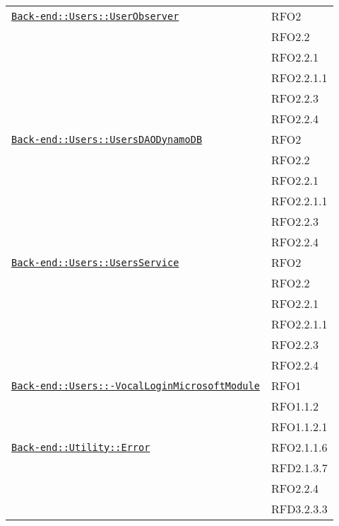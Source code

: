 \begin{longtable}{|>{\centering}m{10cm}|m{3cm}<{\centering}|}
\hyperref[Back-end::Users::UserObserver]{\texttt{Back-end::Users::UserObserver}} & RFO2\\
& RFO2.2\\
& RFO2.2.1\\
& RFO2.2.1.1\\
& RFO2.2.3\\
& RFO2.2.4\\ \hline

\hyperref[Back-end::Users::UsersDAODynamoDB]{\texttt{Back-end::Users::UsersDAODynamoDB}} & RFO2\\
& RFO2.2\\
& RFO2.2.1\\
& RFO2.2.1.1\\
& RFO2.2.3\\
& RFO2.2.4\\ \hline

\hyperref[Back-end::Users::UsersService]{\texttt{Back-end::Users::UsersService}} & RFO2\\
& RFO2.2\\
& RFO2.2.1\\
& RFO2.2.1.1\\
& RFO2.2.3\\
& RFO2.2.4\\ \hline

\hyperref[Back-end::Users::VocalLoginMicrosoftModule]{\texttt{Back-end::Users::-\linebreak VocalLoginMicrosoftModule}} & RFO1\\
& RFO1.1.2\\
& RFO1.1.2.1\\ \hline

\hyperref[Back-end::Utility::Error]{\texttt{Back-end::Utility::Error}} & RFO2.1.1.6\\
& RFD2.1.3.7\\
& RFO2.2.4\\
& RFD3.2.3.3\\ \hline


\end{longtable}
